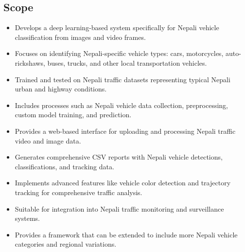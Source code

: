 \documentclass[12pt,a4paper]{report}
\begin{document}
\subsection*{Scope}
\begin{itemize}
    \item Develops a deep learning-based system specifically for Nepali vehicle classification from images and video frames.
    \item Focuses on identifying Nepali-specific vehicle types: cars, motorcycles, auto-rickshaws, buses, trucks, and other local transportation vehicles.
    \item Trained and tested on Nepali traffic datasets representing typical Nepali urban and highway conditions.
    \item Includes processes such as Nepali vehicle data collection, preprocessing, custom model training, and prediction.
    \item Provides a web-based interface for uploading and processing Nepali traffic video and image data.
    \item Generates comprehensive CSV reports with Nepali vehicle detections, classifications, and tracking data.
    \item Implements advanced features like vehicle color detection and trajectory tracking for comprehensive traffic analysis.
    \item Suitable for integration into Nepali traffic monitoring and surveillance systems.
    \item Provides a framework that can be extended to include more Nepali vehicle categories and regional variations.
\end{itemize}
\end{document}
